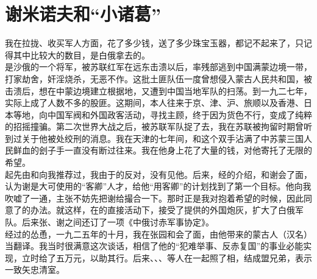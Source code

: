 \fancyhead[RO]{} %
\fancyhead[LE]{} %
\chapter*{谢米诺夫和“小诸葛”}
\thispagestyle{empty}
我在拉拢、收买军人方面，花了多少钱，送了多少珠宝玉器，都记不起来了，只记得其中比较大的数目，是白俄拿去的。\\

是沙俄的一个将军，被苏联红军在远东击溃以后，率残部逃到中国满蒙边境一带，打家劫舍，奸淫烧杀，无恶不作。这批土匪队伍一度曾想侵入蒙古人民共和国，被击溃后，想在中蒙边境建立根据地，又遭到中国当地军队的扫荡。到一九二七年，实际上成了人数不多的股匪。这期间，本人往来于京、津、沪、旅顺以及香港、日本等地，向中国军阀和外国政客活动，寻找主顾，终于因为货色不行，变成了纯粹的招摇撞骗。第二次世界大战之后，被苏联军队捉了去，我在苏联被拘留时期曾听到过关于他被处绞刑的消息。我在天津的七年间，和这个双手沾满了中苏蒙三国人民鲜血的刽子手一直没有断过往来。我在他身上花了大量的钱，对他寄托了无限的希望。\\

起先由和向我推荐过，我由于的反对，没有见他。后来，经的介绍，和谢会了面，认为谢是大可使用的“客卿”人才，给他“用客卿”的计划找到了第一个目标。他向我吹嘘了一通，主张不妨先把谢给撮合一下。那时正是我对抱着希望的时候，因此同意了的办法。就这样，在的直接活动下，接受了提供的外国炮灰，扩大了白俄军队。后来张、谢之间还订了一项《中俄讨赤军事协定》。\\

经过的怂恿，一九二五年的十月，我在张园和会了面，由他带来的蒙古人（汉名）当翻译。我当时很满意这次谈话，相信了他的“犯难举事、反赤复国”的事业必能实现，立时给了五万元，以助其行。后来、、、等人在一起照了相，结成盟兄弟，表示一致矢忠清室。\\

